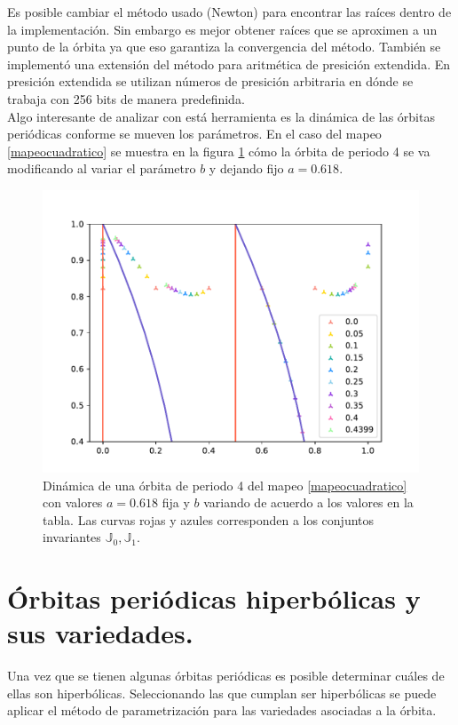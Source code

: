 Es posible cambiar el m\'etodo usado (Newton) para encontrar las ra\'ices dentro de la implementaci\'on. Sin embargo es mejor obtener ra\'ices que se aproximen a un punto de la \'orbita  ya que eso garantiza la convergencia del m\'etodo. Tambi\'en se implement\'o una extensi\'on del m\'etodo para aritm\'etica de presici\'on extendida. En presici\'on extendida se utilizan n\'umeros de presici\'on arbitraria en d\'onde se trabaja con 256 bits de manera predefinida. \\

Algo interesante de analizar con est\'a herramienta es la din\'amica de las \'orbitas peri\'odicas conforme se mueven los par\'ametros. En el caso del mapeo \eqref{mapeocuadratico} se muestra en la figura  \ref{grafmapeocuadraper4variable} c\'omo la \'orbita de periodo 4 se va modificando al variar el par\'ametro $b$ y dejando fijo $a=0.618$.

\begin{figure}[H]
	\centering
	\includegraphics[scale=0.7]{MapeoCuadraP5b}
	\caption{Din\'amica de una \'orbita de periodo 4 del mapeo \eqref{mapeocuadratico} con valores $a=0.618$ fija y $b$ variando de acuerdo a los valores en la tabla. Las curvas rojas y azules corresponden a los conjuntos invariantes $\mathbb{J}_{0}, \mathbb{J}_{1}$. }
	\label{grafmapeocuadraper4variable}
\end{figure}

\section{\'Orbitas peri\'odicas hiperb\'olicas y sus variedades.}
Una vez que se tienen algunas \'orbitas peri\'odicas es posible determinar cu\'ales de ellas son hiperb\'olicas. Seleccionando las que cumplan ser hiperb\'olicas se puede aplicar el m\'etodo de parametrizaci\'on para las variedades asociadas a la \'orbita. \\

